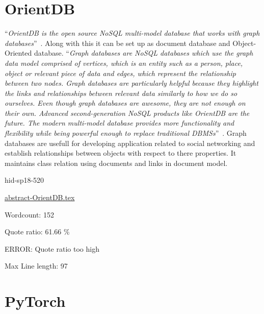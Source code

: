 \section{OrientDB}

\color{blue}``\emph{OrientDB is the open source NoSQL multi-model database that works with graph 
databases}''\color{black}~\cite{hid-sp18-520-OrientDB}. Along with this it can be set up as 
document database and Object-Oriented database. 
\color{blue}``\emph{Graph databases are NoSQL databases which use the graph data model comprised 
of vertices, which is an entity such as a person, place, object or relevant 
piece of data and edges, which represent the relationship between two nodes.
Graph databases are particularly helpful because they highlight the links and
relationships between relevant data similarly to how we do so ourselves.
Even though graph databases are awesome, they are not enough on their own.
Advanced second-generation NoSQL products like OrientDB are the future. The 
modern multi-model database provides more functionality and flexibility while
being powerful enough to replace traditional 
DBMSs}''\color{black}~\cite{hid-sp18-520-OrientDB-graph}.
Graph databases are usefull for developing application related to social 
networking and establish relationships between objects with respect to there 
properties. It maintains class relation using documents and links in document 
model.


\begin{IU}

hid-sp18-520

\href{https://github.com/cloudmesh-community/hid-sp18-520/blob/master//technology/abstract-OrientDB.tex}{abstract-OrientDB.tex}

 

Wordcount: 152


Quote ratio: 61.66 \%

ERROR: Quote ratio too high
 
Max Line length: 97
\end{IU}

\section{PyTorch}

